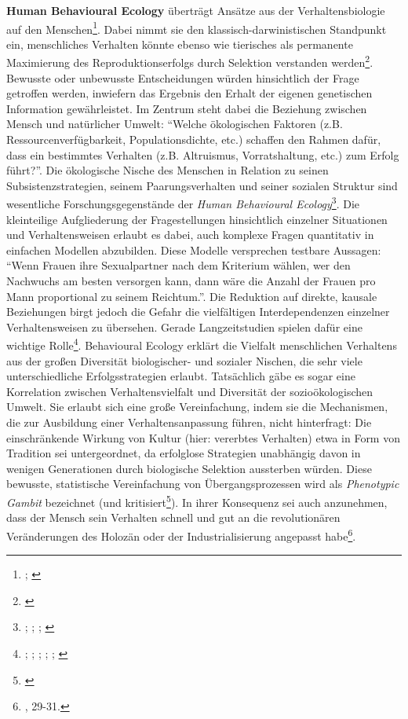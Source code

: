 \documentclass[openany,twoside,twocolumn]{book}
\let\rmarkdownfootnote\footnote%
\def\footnote{\protect\rmarkdownfootnote}
\begin{document}
\textbf{Human Behavioural Ecology} überträgt Ansätze aus der
Verhaltensbiologie auf den Menschen\footnote{\textcite{smith_cultural_1992};
  \textcite{winterhalder_analyzing_2000}}. Dabei nimmt sie den
klassisch-darwinistischen Standpunkt ein, menschliches Verhalten könnte
ebenso wie tierisches als permanente Maximierung des
Reproduktionserfolgs durch Selektion verstanden werden\footnote{\textcite{creanza_cultural_2017}}.
Bewusste oder unbewusste Entscheidungen würden hinsichtlich der Frage
getroffen werden, inwiefern das Ergebnis den Erhalt der eigenen
genetischen Information gewährleistet. Im Zentrum steht dabei die
Beziehung zwischen Mensch und natürlicher Umwelt: ``Welche ökologischen
Faktoren (z.B. Ressourcenverfügbarkeit, Populationsdichte, etc.)
schaffen den Rahmen dafür, dass ein bestimmtes Verhalten (z.B.
Altruismus, Vorratshaltung, etc.) zum Erfolg führt?''. Die ökologische
Nische des Menschen in Relation zu seinen Subsistenzstrategien, seinem
Paarungsverhalten und seiner sozialen Struktur sind wesentliche
Forschungsgegenstände der \emph{Human Behavioural Ecology}\footnote{\textcite{henrich_search_2001};
  \textcite{kaplan_theory_2000}; \textcite{voland_evolutionary_1998};
  \textcite{winterhalder_risk-senstive_1999}}. Die kleinteilige
Aufgliederung der Fragestellungen hinsichtlich einzelner Situationen und
Verhaltensweisen erlaubt es dabei, auch komplexe Fragen quantitativ in
einfachen Modellen abzubilden. Diese Modelle versprechen testbare
Aussagen: ``Wenn Frauen ihre Sexualpartner nach dem Kriterium wählen,
wer den Nachwuchs am besten versorgen kann, dann wäre die Anzahl der
Frauen pro Mann proportional zu seinem Reichtum.''. Die Reduktion auf
direkte, kausale Beziehungen birgt jedoch die Gefahr die vielfältigen
Interdependenzen einzelner Verhaltensweisen zu übersehen. Gerade
Langzeitstudien spielen dafür eine wichtige Rolle\footnote{\textcite{belovsky_optimal_1988};
  \textcite{broughton_widening_1997}; \textcite{low_population_1993};
  \textcite{stiner_paleolithic_1999}; \textcite{stiner_tortoise_2000};
  \textcite{winterhalder_population_1988}}. Behavioural Ecology erklärt
die Vielfalt menschlichen Verhaltens aus der großen Diversität
biologischer- und sozialer Nischen, die sehr viele unterschiedliche
Erfolgsstrategien erlaubt. Tatsächlich gäbe es sogar eine Korrelation
zwischen Verhaltensvielfalt und Diversität der sozioökologischen Umwelt.
Sie erlaubt sich eine große Vereinfachung, indem sie die Mechanismen,
die zur Ausbildung einer Verhaltensanpassung führen, nicht hinterfragt:
Die einschränkende Wirkung von Kultur (hier: vererbtes Verhalten) etwa
in Form von Tradition sei untergeordnet, da erfolglose Strategien
unabhängig davon in wenigen Generationen durch biologische Selektion
aussterben würden. Diese bewusste, statistische Vereinfachung von
Übergangsprozessen wird als \emph{Phenotypic Gambit} bezeichnet (und
kritisiert\footnote{\textcite{rubin_phenotypic_2016}}). In ihrer
Konsequenz sei auch anzunehmen, dass der Mensch sein Verhalten schnell
und gut an die revolutionären Veränderungen des Holozän oder der
Industrialisierung angepasst habe\footnote{\textcite{SmithThreestylesevolutionary2000},
  29-31.}.
\end{document}
